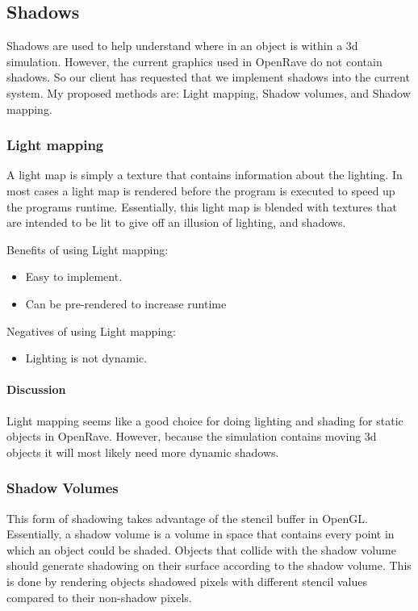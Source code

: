 \documentclass[10pt,journal,compsoc,draftclsnofoot]{IEEEtran}
\begin{document}
\newpage
\subsection{Shadows}
Shadows are used to help understand where in an object is within a 3d simulation.
However, the current graphics used in OpenRave do not contain shadows.
So our client has requested that we implement shadows into the current system.
My proposed methods are: Light mapping, Shadow volumes, and Shadow mapping.

\subsubsection{Light mapping}
A light map is simply a texture that contains information about the lighting. 
In most cases a light map is rendered before the program is executed to speed up the programs runtime.
Essentially, this light map is blended with textures that are intended to be lit to give off an illusion of lighting, and shadows.\cite{lightmapping}

Benefits of using Light mapping:
\begin{itemize}
\item Easy to implement.
\item Can be pre-rendered to increase runtime
\end{itemize}

Negatives of using Light mapping:
\begin{itemize}
\item Lighting is not dynamic.
\end{itemize}

\paragraph{Discussion}
Light mapping seems like a good choice for doing lighting and shading for static objects in OpenRave.
However, because the simulation contains moving 3d objects it will most likely need more dynamic shadows.

\subsubsection{Shadow Volumes}
This form of shadowing takes advantage of the stencil buffer in OpenGL.
Essentially, a shadow volume is a volume in space that contains every point in which an object could be shaded.
Objects that collide with the shadow volume should generate shadowing on their surface according to the shadow volume.
This is done by rendering objects shadowed pixels with different stencil values compared to their non-shadow pixels. \cite{volume}
\end{document}
